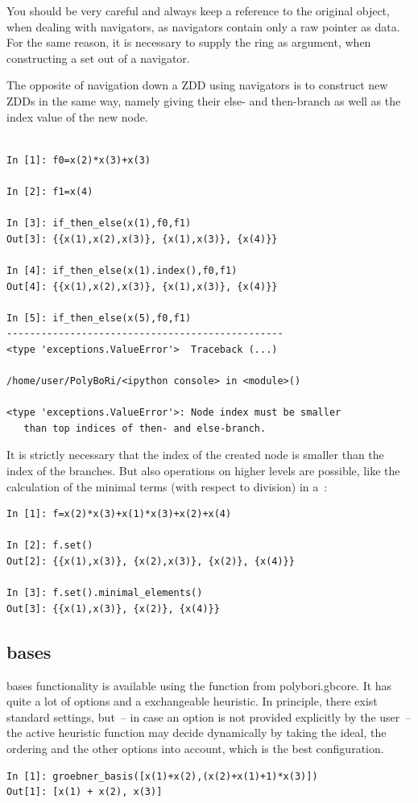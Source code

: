 You should be very careful and always keep a reference to the original object, when dealing with navigators, as navigators contain only a raw pointer as data.
For the same reason, it is necessary to supply the ring as argument, when constructing a set out of a navigator.

The opposite of navigation down a ZDD using navigators is to construct new ZDDs in the same way, namely giving their else- and then-branch as well as the index value of the new node.

\begin{lstlisting}
    
In [1]: f0=x(2)*x(3)+x(3)

In [2]: f1=x(4)

In [3]: if_then_else(x(1),f0,f1)
Out[3]: {{x(1),x(2),x(3)}, {x(1),x(3)}, {x(4)}}

In [4]: if_then_else(x(1).index(),f0,f1)
Out[4]: {{x(1),x(2),x(3)}, {x(1),x(3)}, {x(4)}}

In [5]: if_then_else(x(5),f0,f1)
------------------------------------------------
<type 'exceptions.ValueError'>  Traceback (...) 

/home/user/PolyBoRi/<ipython console> in <module>()

<type 'exceptions.ValueError'>: Node index must be smaller
   than top indices of then- and else-branch.
\end{lstlisting}

It is strictly necessary that the index of the created node is smaller than the index of the branches.
%
%
But also operations on higher levels are possible, like the calculation of the minimal terms (with respect to division) in a~:
\begin{lstlisting}
In [1]: f=x(2)*x(3)+x(1)*x(3)+x(2)+x(4)

In [2]: f.set()
Out[2]: {{x(1),x(3)}, {x(2),x(3)}, {x(2)}, {x(4)}}

In [3]: f.set().minimal_elements()
Out[3]: {{x(1),x(3)}, {x(2)}, {x(4)}}
\end{lstlisting}

\subsection{\Groebner bases}
\Groebner bases functionality is available using the function  from polybori.gbcore.
It has quite a lot of options and a exchangeable heuristic.
In principle, there exist  standard settings, but~-- in case an option is not
provided explicitly by the user~-- the active heuristic function
may decide dynamically by taking the ideal, the ordering and the other options into account, which is the best configuration.
\begin{lstlisting}
In [1]: groebner_basis([x(1)+x(2),(x(2)+x(1)+1)*x(3)])
Out[1]: [x(1) + x(2), x(3)]
\end{lstlisting}

